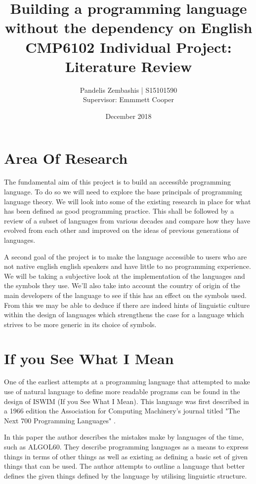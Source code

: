 \documentclass[12pt]{article}
\title{%
  Building a programming language without the dependency on English \\
  \large CMP6102 Individual Project:
    Literature Review }
\author{Pandelis Zembashis | S15101590 \\
Supervisor: Emmmett Cooper}
\date{December 2018}
\begin{document}
\maketitle

\clearpage


\section{Area Of Research}

The fundamental aim of this project is to build an accessible programming language. To do so we will need to explore
the base principals of programming language theory. We will look into some of the existing research in place for what
has been defined as good programming practice. This shall be followed by a review of a subset of languages from various
decades and compare how they have evolved from each other and improved on the ideas of previous generations of languages.

A second goal of the project is to make the language accessible to users who are not native english english speakers and
have little to no programming experience. We will be taking a subjective look at the implementation of the languages and
the symbols they use. We'll also take into account the country of origin of the main developers of the language to see if
this has an effect on the symbols used. From this we may be able to deduce if there are indeed hints of linguistic culture
within the design of languages which strengthens the case for a language which strives to be more generic in its choice
of symbols.


\section{If you See What I Mean}

One of the earliest attempts at a programming language that attempted to make use of natural language
to define more readable programs can be found in the design of ISWIM (If you See What I Mean). This
language was first described in a 1966 edition the Association for Computing Machinery's journal
titled "The Next 700 Programming Languages" \parencite{Landin:1966:NPL:365230.365257}.

In this paper the author describes the mistakes make by languages of the time, such as ALGOL60.
They describe programming languages as a means to express things in terms of other things as well as
existing as defining a basic set of given things that can be used. The author attempts to outline a language
that better defines the given things defined by the language by utilising linguistic structure.
\end{document}
